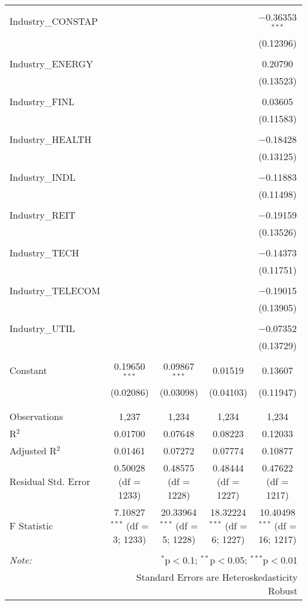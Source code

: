 \begin{table}[!htbp]
\begin{tabular}{@{\extracolsep{5pt}}lcccc}
  & & & & \\ 
 Industry\_CONSTAP &  &  &  & $-$0.36353$^{***}$ \\ 
  &  &  &  & (0.12396) \\ 
  & & & & \\ 
 Industry\_ENERGY &  &  &  & 0.20790 \\ 
  &  &  &  & (0.13523) \\ 
  & & & & \\ 
 Industry\_FINL &  &  &  & 0.03605 \\ 
  &  &  &  & (0.11583) \\ 
  & & & & \\ 
 Industry\_HEALTH &  &  &  & $-$0.18428 \\ 
  &  &  &  & (0.13125) \\ 
  & & & & \\ 
 Industry\_INDL &  &  &  & $-$0.11883 \\ 
  &  &  &  & (0.11498) \\ 
  & & & & \\ 
 Industry\_REIT &  &  &  & $-$0.19159 \\ 
  &  &  &  & (0.13526) \\ 
  & & & & \\ 
 Industry\_TECH &  &  &  & $-$0.14373 \\ 
  &  &  &  & (0.11751) \\ 
  & & & & \\ 
 Industry\_TELECOM &  &  &  & $-$0.19015 \\ 
  &  &  &  & (0.13905) \\ 
  & & & & \\ 
 Industry\_UTIL &  &  &  & $-$0.07352 \\ 
  &  &  &  & (0.13729) \\ 
  & & & & \\ 
 Constant & 0.19650$^{***}$ & 0.09867$^{***}$ & 0.01519 & 0.13607 \\ 
  & (0.02086) & (0.03098) & (0.04103) & (0.11947) \\ 
  & & & & \\ 
\hline \\[-1.8ex] 
Observations & 1,237 & 1,234 & 1,234 & 1,234 \\ 
R$^{2}$ & 0.01700 & 0.07648 & 0.08223 & 0.12033 \\ 
Adjusted R$^{2}$ & 0.01461 & 0.07272 & 0.07774 & 0.10877 \\ 
Residual Std. Error & 0.50028 (df = 1233) & 0.48575 (df = 1228) & 0.48444 (df = 1227) & 0.47622 (df = 1217) \\ 
F Statistic & 7.10827$^{***}$ (df = 3; 1233) & 20.33964$^{***}$ (df = 5; 1228) & 18.32224$^{***}$ (df = 6; 1227) & 10.40498$^{***}$ (df = 16; 1217) \\ 
\hline 
\hline \\[-1.8ex] 
\textit{Note:}  & \multicolumn{4}{r}{$^{*}$p$<$0.1; $^{**}$p$<$0.05; $^{***}$p$<$0.01} \\ 
 & \multicolumn{4}{r}{Standard Errors are Heteroskedasticity Robust} \\ 
\end{tabular} 
\end{table} 
